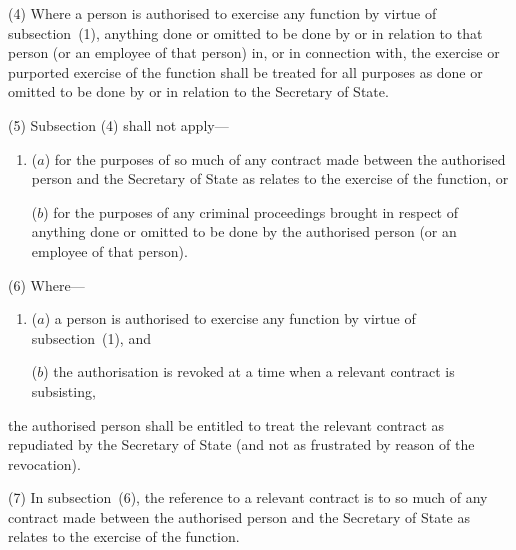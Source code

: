 \documentclass[12pt,a4paper]{article}
\begin{document}
(4) Where a person is authorised to exercise any function by virtue of subsection~(1), anything done or omitted to be done by or in relation to that person (or an employee of that person) in, or in connection with, the exercise or purported exercise of the function shall be treated for all purposes as done or omitted to be done by or in relation to the Secretary of State.

(5) Subsection (4) shall not apply—
\begin{enumerate}\item[]
($a$) for the purposes of so much of any contract made between the authorised person and the Secretary of State as relates to the exercise of the function, or

($b$) for the purposes of any criminal proceedings brought in respect of anything done or omitted to be done by the authorised person (or an employee of that person).
\end{enumerate}

(6) Where—
\begin{enumerate}\item[]
($a$) a person is authorised to exercise any function by virtue of subsection~(1), and

($b$) the authorisation is revoked at a time when a relevant contract is subsisting,
\end{enumerate}
the authorised person shall be entitled to treat the relevant contract as repudiated by the Secretary of State (and not as frustrated by reason of the revocation).

(7) In subsection~(6), the reference to a relevant contract is to so much of any contract made between the authorised person and the Secretary of State as relates to the exercise of the function.

\end{document}
